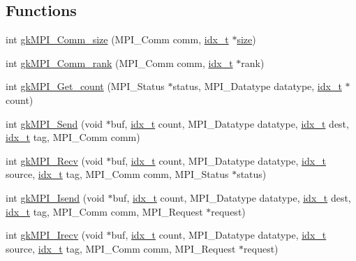 \subsection*{Functions}
\begin{DoxyCompactItemize}
\item 
int \hyperlink{a00359_aa6be69b686449a61266c75f859a7384a}{gk\+M\+P\+I\+\_\+\+Comm\+\_\+size} (M\+P\+I\+\_\+\+Comm comm, \hyperlink{a00876_aaa5262be3e700770163401acb0150f52}{idx\+\_\+t} $\ast$\hyperlink{a00611_ad6cb0afbbe6ea4f56407890be2533966}{size})
\item 
int \hyperlink{a00359_a3d476c06613e7a647941fcbeb002e5e6}{gk\+M\+P\+I\+\_\+\+Comm\+\_\+rank} (M\+P\+I\+\_\+\+Comm comm, \hyperlink{a00876_aaa5262be3e700770163401acb0150f52}{idx\+\_\+t} $\ast$rank)
\item 
int \hyperlink{a00359_a3f4ae6f17f49b22ef461eb0a96853302}{gk\+M\+P\+I\+\_\+\+Get\+\_\+count} (M\+P\+I\+\_\+\+Status $\ast$status, M\+P\+I\+\_\+\+Datatype datatype, \hyperlink{a00876_aaa5262be3e700770163401acb0150f52}{idx\+\_\+t} $\ast$count)
\item 
int \hyperlink{a00359_a2442b8eee4afc113918cd7a5878244b6}{gk\+M\+P\+I\+\_\+\+Send} (void $\ast$buf, \hyperlink{a00876_aaa5262be3e700770163401acb0150f52}{idx\+\_\+t} count, M\+P\+I\+\_\+\+Datatype datatype, \hyperlink{a00876_aaa5262be3e700770163401acb0150f52}{idx\+\_\+t} dest, \hyperlink{a00876_aaa5262be3e700770163401acb0150f52}{idx\+\_\+t} tag, M\+P\+I\+\_\+\+Comm comm)
\item 
int \hyperlink{a00359_a4eebc3896a4356902599bd3d3dd077f3}{gk\+M\+P\+I\+\_\+\+Recv} (void $\ast$buf, \hyperlink{a00876_aaa5262be3e700770163401acb0150f52}{idx\+\_\+t} count, M\+P\+I\+\_\+\+Datatype datatype, \hyperlink{a00876_aaa5262be3e700770163401acb0150f52}{idx\+\_\+t} source, \hyperlink{a00876_aaa5262be3e700770163401acb0150f52}{idx\+\_\+t} tag, M\+P\+I\+\_\+\+Comm comm, M\+P\+I\+\_\+\+Status $\ast$status)
\item 
int \hyperlink{a00359_a575274feee728e0cabbca8b68fcea3fb}{gk\+M\+P\+I\+\_\+\+Isend} (void $\ast$buf, \hyperlink{a00876_aaa5262be3e700770163401acb0150f52}{idx\+\_\+t} count, M\+P\+I\+\_\+\+Datatype datatype, \hyperlink{a00876_aaa5262be3e700770163401acb0150f52}{idx\+\_\+t} dest, \hyperlink{a00876_aaa5262be3e700770163401acb0150f52}{idx\+\_\+t} tag, M\+P\+I\+\_\+\+Comm comm, M\+P\+I\+\_\+\+Request $\ast$request)
\item 
int \hyperlink{a00359_af66daa80152ba26f528a2c6d9c86e98c}{gk\+M\+P\+I\+\_\+\+Irecv} (void $\ast$buf, \hyperlink{a00876_aaa5262be3e700770163401acb0150f52}{idx\+\_\+t} count, M\+P\+I\+\_\+\+Datatype datatype, \hyperlink{a00876_aaa5262be3e700770163401acb0150f52}{idx\+\_\+t} source, \hyperlink{a00876_aaa5262be3e700770163401acb0150f52}{idx\+\_\+t} tag, M\+P\+I\+\_\+\+Comm comm, M\+P\+I\+\_\+\+Request $\ast$request)

\end{DoxyCompactItemize}
